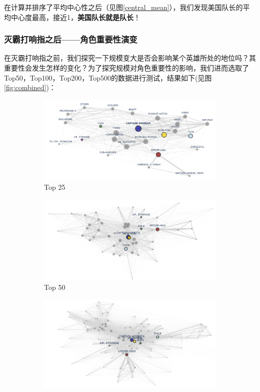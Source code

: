 \documentclass[12pt]{xjtureport}
\begin{document}
在计算并排序了平均中心性之后（见图\ref{central_mean}），我们发现美国队长的平均中心度最高，接近1，\textbf{美国队长就是队长}！

\subsubsection{灭霸打响指之后——角色重要性演变}
在灭霸打响指之前，我们探究一下规模变大是否会影响某个英雄所处的地位吗？其重要性会发生怎样的变化？为了探究规模对角色重要性的影响，我们进而选取了Top50，Top100，Top200，Top500的数据进行测试，结果如下(见图\ref{fig:combined})：
\begin{figure}[htbp]
    \centering
    \begin{subfigure}[b]{0.3\textwidth}
      \includegraphics[width=\textwidth]{figures/top 25 Heroes Network.png}
      \caption{Top 25}
      \label{fig:sub1}
    \end{subfigure}
    \hfill
    \begin{subfigure}[b]{0.3\textwidth}
      \includegraphics[width=\textwidth]{figures/top 50 Heroes Network.png}
      \caption{Top 50}
      \label{fig:sub2}
    \end{subfigure}
    \hfill
    \begin{subfigure}[b]{0.3\textwidth}
      \includegraphics[width=\textwidth]{figures/top 100 Heroes Network.png}

\end{subfigure}
\end{figure}
\end{document}
